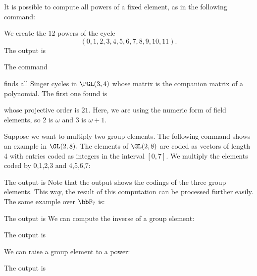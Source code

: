 \bigskip



It is possible to compute all powers of a fixed element, as in the following command:


We create the 12 powers of the cycle 
$$
(0,1,2,3,4,5,6,7,8,9,10,11).
$$
The output is


\bigskip


The command


finds all Singer cycles in $\PGL(3,4)$ 
whose matrix is the companion matrix of a polynomial. 
The first one found is 




whose projective order is $21.$ 
Here, we are using the numeric form of field elements, 
so $2$ is $\omega$ and $3$ is $\omega+1.$

\bigskip

Suppose we want to multiply two group elements. 
The following command shows an example in $\GL(2,8).$ 
The elements of $\GL(2,8)$ 
are coded as vectors of length 4 with entries coded as integers in the interval $[0,7]$. 
We multiply the elements coded by 0,1,2,3 and 4,5,6,7:


The output is
Note that the output shows the codings of the three group elements. 
This way, the result of this computation can be processed further easily.
The same example over $\bbF_7$ is:


The output is
We can compute the inverse of a group element:


The output is


We can raise a group element to a power:


The output is


\bigskip



